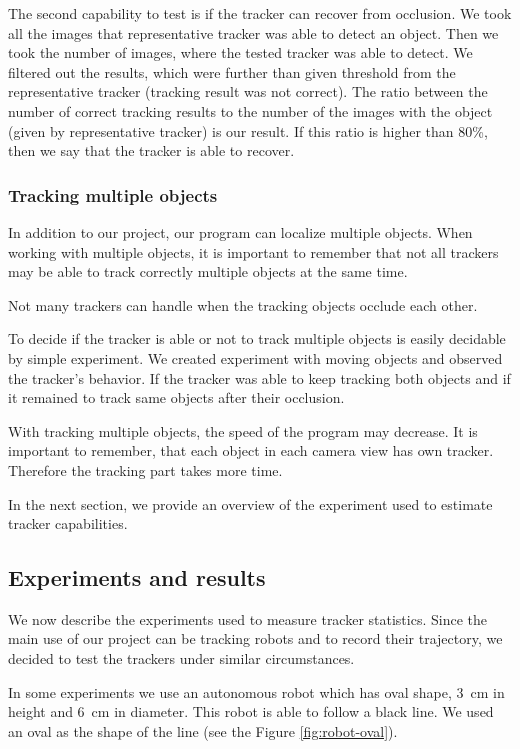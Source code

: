 The second capability to test is if the tracker can recover from occlusion.
We took all the images that representative tracker was able to detect an
object. Then we took the number of images, where the tested tracker was able to
detect. We filtered out the results, which were further than given threshold
from the representative tracker (tracking result was not correct). The ratio
between the number of correct tracking results to the number of the images with
the object (given by representative tracker) is our result. If this ratio is
higher than 80\%, then we say that the tracker is able to recover.

\subsubsection*{Tracking multiple objects}

In addition to our project, our program can localize multiple objects. When
working with multiple objects, it is important to remember that not all
trackers may be able to track correctly multiple objects at the same time.

Not many trackers can handle when the tracking objects occlude each other.

To decide if the tracker is able or not to track multiple objects is easily
decidable by simple experiment. We created experiment with moving objects and
observed the tracker's behavior. If the tracker was able to keep tracking both
objects and if it remained to track same objects after their occlusion.

With tracking multiple objects, the speed of the program may decrease.
It is important to remember, that each object in each camera view has own
tracker. Therefore the tracking part takes more time.

In the next section, we provide an overview of the experiment used to estimate
tracker capabilities.


\subsection{Experiments and results}

We now describe the experiments used to measure tracker statistics. Since the
main use of our project can be tracking robots and to record their trajectory,
we decided to test the trackers under similar circumstances.

In some experiments we use an autonomous robot which has oval shape, 3~cm
in height and 6~cm in diameter. This robot is able to follow a black line.
We used an oval as the shape of the line (see the Figure \ref{fig:robot-oval}).

